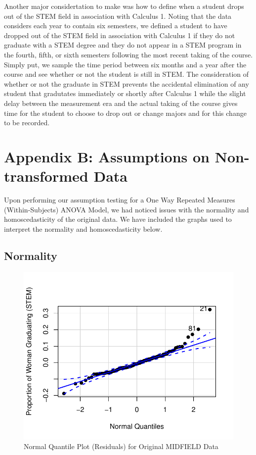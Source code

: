 \documentclass[]{article}
\begin{document}
Another major considertation to make was how to define when a student
drops out of the STEM field in association with Calculus 1. Noting that
the data considers each year to contain six semesters, we defined a
student to have dropped out of the STEM field in association with
Calculus 1 if they do not graduate with a STEM degree and they do not
appear in a STEM program in the fourth, fifth, or sixth semesters
following the most recent taking of the course. Simply put, we sample
the time period between six months and a year after the course and see
whether or not the student is still in STEM. The consideration of
whether or not the graduate in STEM prevents the accidental elimination
of any student that gradutates immediately or shortly after Calculus 1
while the slight delay between the measurement era and the actual taking
of the course gives time for the student to choose to drop out or change
majors and for this change to be recorded.

\newpage

\section{Appendix B: Assumptions on Non-transformed
Data}\label{appendix-b-assumptions-on-non-transformed-data}

Upon performing our assumption testing for a One Way Repeated Measures
(Within-Subjects) ANOVA Model, we had noticed issues with the normality
and homoscedasticity of the original data. We have included the graphs
used to interpret the normality and homoscedasticity below.

\subsection{Normality}\label{normality}

\begin{figure}
\centering
\includegraphics{Stat_461_Final_Project_Report_files/figure-latex/normality-1.pdf}
\caption{Normal Quantile Plot (Residuals) for Original MIDFIELD Data}
\end{figure}
\end{document}
